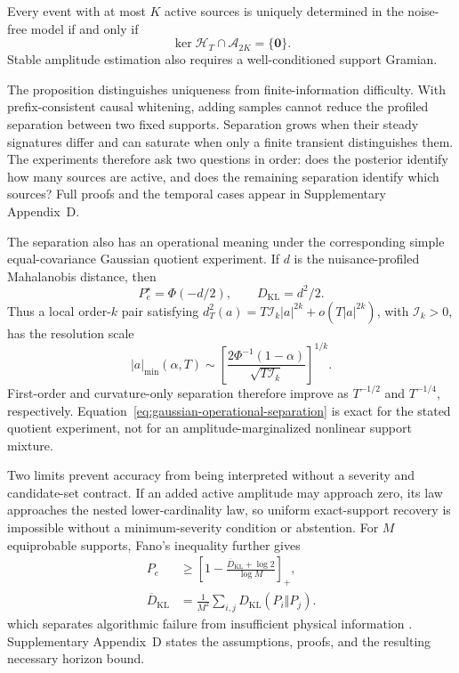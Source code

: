 \begin{proposition}
\label{prop:sparse-event-injectivity}
Every event with at most $K$ active sources is uniquely determined in the noise-free model if and only if
\begin{equation}
 \ker\mathcal H_T\cap\mathcal A_{2K}=\{\bm0\}.
 \label{eq:sparse-injectivity-condition}
\end{equation}
Stable amplitude estimation also requires a well-conditioned support Gramian.
\end{proposition}

The proposition distinguishes uniqueness from finite-information difficulty. With prefix-consistent causal whitening, adding samples cannot reduce the profiled separation between two fixed supports. Separation grows when their steady signatures differ and can saturate when only a finite transient distinguishes them. The experiments therefore ask two questions in order: does the posterior identify how many sources are active, and does the remaining separation identify which sources? Full proofs and the temporal cases appear in Supplementary Appendix~D.

The separation also has an operational meaning under the corresponding simple
equal-covariance Gaussian quotient experiment. If $d$ is the nuisance-profiled
Mahalanobis distance, then
\begin{equation}
 P_e^\star=\Phi(-d/2),\qquad
 D_{\mathrm{KL}}=d^2/2.
 \label{eq:gaussian-operational-separation}
\end{equation}
Thus a local order-$k$ pair satisfying
$d_T^2(a)=T\mathcal I_k|a|^{2k}+o(T|a|^{2k})$, with
$\mathcal I_k>0$, has the resolution scale
\begin{equation}
 |a|_{\min}(\alpha,T)\sim
 \left[\frac{2\Phi^{-1}(1-\alpha)}{\sqrt{T\mathcal I_k}}
 \right]^{1/k}.
 \label{eq:order-k-resolution-scale}
\end{equation}
First-order and curvature-only separation therefore improve as $T^{-1/2}$ and
$T^{-1/4}$, respectively. Equation~\eqref{eq:gaussian-operational-separation}
is exact for the stated quotient experiment, not for an amplitude-marginalized
nonlinear support mixture.

Two limits prevent accuracy from being interpreted without a severity and
candidate-set contract. If an added active amplitude may approach zero, its law
approaches the nested lower-cardinality law, so uniform exact-support recovery
is impossible without a minimum-severity condition or abstention. For $M$
equiprobable supports, Fano's inequality further gives
\begin{equation}
 \begin{aligned}
 P_e&\geq\left[1-\frac{\overline D_{\mathrm{KL}}+\log 2}{\log M}
 \right]_+,\\
 \overline D_{\mathrm{KL}}&=\frac{1}{M^2}
 \sum_{i,j}D_{\mathrm{KL}}(P_i\Vert P_j).
 \end{aligned}
 \label{eq:fano-support-bound}
\end{equation}
which separates algorithmic failure from insufficient physical information
\cite{cover2006elements,tsybakov2009nonparametric}. Supplementary Appendix~D
states the assumptions, proofs, and the resulting necessary horizon bound.
